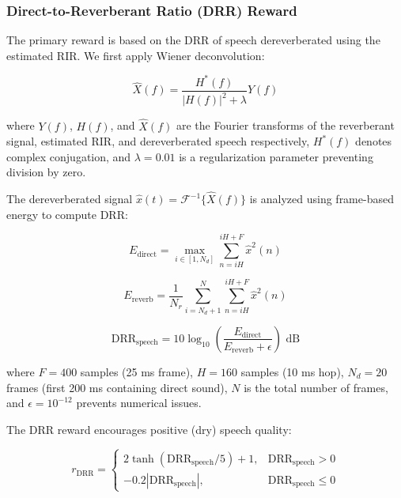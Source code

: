 \subsubsection{Direct-to-Reverberant Ratio (DRR) Reward}

The primary reward is based on the DRR of speech dereverberated using the estimated RIR. We first apply Wiener deconvolution:

\begin{equation}
\hat{X}(f) = \frac{H^*(f)}{|H(f)|^2 + \lambda} Y(f)
\label{eq:wiener_deconvolution}
\end{equation}

\noindent where $Y(f)$, $H(f)$, and $\hat{X}(f)$ are the Fourier transforms of the reverberant signal, estimated RIR, and dereverberated speech respectively, $H^*(f)$ denotes complex conjugation, and $\lambda = 0.01$ is a regularization parameter preventing division by zero.

The dereverberated signal $\hat{x}(t) = \mathcal{F}^{-1}\{\hat{X}(f)\}$ is analyzed using frame-based energy to compute DRR:

\begin{equation}
E_\text{direct} = \max_{i \in [1, N_d]} \sum_{n=iH}^{iH + F} \hat{x}^2(n)
\label{eq:direct_energy}
\end{equation}

\begin{equation}
E_\text{reverb} = \frac{1}{N_r} \sum_{i=N_d+1}^{N} \sum_{n=iH}^{iH + F} \hat{x}^2(n)
\label{eq:reverb_energy}
\end{equation}

\begin{equation}
\text{DRR}_\text{speech} = 10 \log_{10} \left( \frac{E_\text{direct}}{E_\text{reverb} + \epsilon} \right) \text{ dB}
\label{eq:speech_drr}
\end{equation}

\noindent where $F = 400$ samples (25 ms frame), $H = 160$ samples (10 ms hop), $N_d = 20$ frames (first 200 ms containing direct sound), $N$ is the total number of frames, and $\epsilon = 10^{-12}$ prevents numerical issues.

The DRR reward encourages positive (dry) speech quality:

\begin{equation}
r_\text{DRR} = \begin{cases}
2 \tanh(\text{DRR}_\text{speech}/5) + 1, & \text{DRR}_\text{speech} > 0 \\
-0.2 |\text{DRR}_\text{speech}|, & \text{DRR}_\text{speech} \leq 0
\end{cases}
\label{eq:drr_reward}
\end{equation}


